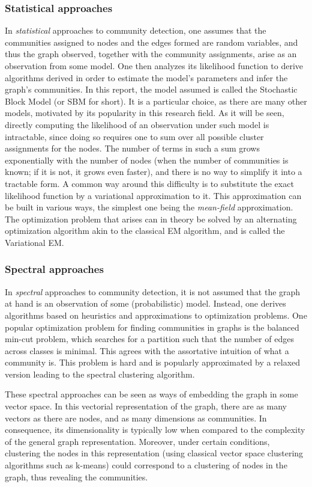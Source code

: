 \documentclass[../../main.tex]{subfiles} %
\begin{document}
\subsubsection{Statistical approaches}
In \textit{statistical} approaches to community detection, one assumes that 
the communities assigned to nodes and the edges formed are random variables, 
and thus the graph observed, together with the community assignments, arise 
as an observation from some model. One 
then analyzes its likelihood function to derive algorithms derived in order to 
estimate the model's parameters and infer the graph's communities. In this 
report, the model assumed is called the Stochastic Block Model (or SBM for 
short). It is a particular choice, as there are many other models, motivated by its 
popularity in this research field. As it will be seen, directly computing the 
likelihood of an observation under such model is intractable, since doing so 
requires one to sum over all possible cluster assignments for the nodes. The 
number of terms in such a sum grows exponentially with the number of nodes 
(when the number of communities is known; if it is not, it grows even faster), 
and there is no way to simplify it into a tractable form. A common way around 
this difficulty is to substitute the exact likelihood function by a variational 
approximation to it. This approximation can be built in various ways, the 
simplest one being the \textit{mean-field} approximation. The optimization 
problem that arises can in theory be solved by an alternating optimization 
algorithm akin to the classical EM algorithm, and is called the Variational EM.

\subsubsection{Spectral approaches}
In \textit{spectral} approaches to community 
detection, it is not 
assumed 
that the graph at hand is an observation of some (probabilistic) model. 
Instead, 
one derives algorithms based on heuristics and approximations to 
optimization 
problems. One popular optimization problem for finding communities in 
graphs 
is the balanced min-cut problem, which searches for a partition such that 
the 
number of edges across classes is minimal. This agrees with the assortative 
intuition of what a community is. This problem is hard and is popularly 
approximated by a relaxed version leading to the spectral clustering 
algorithm.

These spectral approaches can be seen as ways of embedding the graph in 
some vector space. In this vectorial representation of the graph, there are 
as 
many vectors as there are nodes, and as many dimensions as communities. 
In 
consequence, its dimensionality is typically low when compared to the 
complexity of the general graph representation. Moreover, under certain 
conditions, clustering the nodes in this representation (using classical 
vector 
space clustering algorithms such as k-means) could correspond to a 
clustering 
of nodes in the graph, thus revealing the communities.
\end{document}
